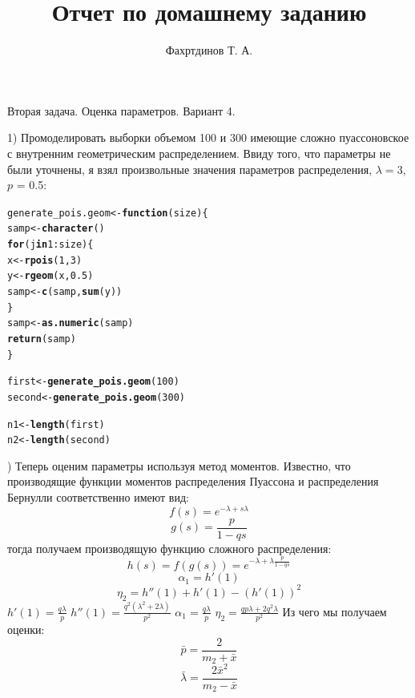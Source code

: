 \documentclass{article}\usepackage[]{graphicx}\usepackage[]{color}
\makeatletter
\newcommand{\hlnum}[1]{\textcolor[rgb]{0.686,0.059,0.569}{#1}}%
\newcommand{\hlopt}[1]{\textcolor[rgb]{0,0,0}{#1}}%
\newcommand{\hlstd}[1]{\textcolor[rgb]{0.345,0.345,0.345}{#1}}%
\newcommand{\hlkwa}[1]{\textcolor[rgb]{0.161,0.373,0.58}{\textbf{#1}}}%
\newcommand{\hlkwb}[1]{\textcolor[rgb]{0.69,0.353,0.396}{#1}}%
\newcommand{\hlkwc}[1]{\textcolor[rgb]{0.333,0.667,0.333}{#1}}%
\newcommand{\hlkwd}[1]{\textcolor[rgb]{0.737,0.353,0.396}{\textbf{#1}}}%
\newenvironment{kframe}{%
 \def\at@end@of@kframe{}%
 \ifinner\ifhmode%
  \def\at@end@of@kframe{\end{minipage}}%
  \begin{minipage}{\columnwidth}%
 \fi\fi%
 \def\FrameCommand##1{\hskip\@totalleftmargin \hskip-\fboxsep
 \colorbox{shadecolor}{##1}\hskip-\fboxsep
     \hskip-\linewidth \hskip-\@totalleftmargin \hskip\columnwidth}%
 \MakeFramed {\advance\hsize-\width
   \@totalleftmargin\z@ \linewidth\hsize
   \@setminipage}}%
 {\par\unskip\endMakeFramed%
 \at@end@of@kframe}
\newenvironment{knitrout}{}{} %
\makeatother
\begin{document}
\title{Отчет по домашнему заданию}
\pretitle{\vspace{\droptitle}\centering\huge}
\posttitle{\par}
\author{Фахртдинов Т. А.}


\maketitle

Вторая задача. Оценка параметров.
Вариант 4.

1) Промоделировать выборки объемом 100 и 300 имеющие сложно пуассоновское с внутренним геометрическим распределением. Ввиду того, что параметры не были уточнены, я взял произвольные значения параметров распределения, $\lambda = 3$, $p$ = 0.5:
\begin{knitrout}
\color{fgcolor}\begin{kframe}
\begin{alltt}
\hlstd{generate_pois.geom} \hlkwb{<-} \hlkwa{function}\hlstd{(}\hlkwc{size}\hlstd{)\{}
  \hlstd{samp} \hlkwb{<-} \hlkwd{character}\hlstd{()}
  \hlkwa{for} \hlstd{(j} \hlkwa{in} \hlnum{1}\hlopt{:}\hlstd{size) \{}
    \hlstd{x} \hlkwb{<-} \hlkwd{rpois}\hlstd{(}\hlnum{1}\hlstd{,} \hlnum{3}\hlstd{)}
    \hlstd{y} \hlkwb{<-} \hlkwd{rgeom}\hlstd{(x,} \hlnum{0.5}\hlstd{)}
    \hlstd{samp} \hlkwb{<-} \hlkwd{c}\hlstd{(samp,} \hlkwd{sum}\hlstd{(y))}
  \hlstd{\}}
  \hlstd{samp} \hlkwb{<-} \hlkwd{as.numeric}\hlstd{(samp)}
  \hlkwd{return}\hlstd{(samp)}
\hlstd{\}}

\hlstd{first} \hlkwb{<-} \hlkwd{generate_pois.geom}\hlstd{(}\hlnum{100}\hlstd{)}
\hlstd{second} \hlkwb{<-} \hlkwd{generate_pois.geom}\hlstd{(}\hlnum{300}\hlstd{)}

\hlstd{n1} \hlkwb{<-} \hlkwd{length}\hlstd{(first)}
\hlstd{n2} \hlkwb{<-} \hlkwd{length}\hlstd{(second)}
\end{alltt}
\end{kframe}
\end{knitrout}
2) Теперь оценим параметры используя метод моментов.
Известно, что производящие функции моментов распределения Пуассона и распределения Бернулли соответственно имеют вид:
$$f(s) = e^{-\lambda + s\lambda}$$
$$g(s) = \frac{p}{1 - qs}$$
тогда получаем производящую функцию сложного распределения:
$$h(s) = f(g(s)) = e^{-\lambda + \lambda  \frac{p}{1 - qs}}$$
$$\alpha_1 = h'(1)$$
$$\eta_2 = h''(1) + h'(1) - (h'(1))^2$$
$h'(1) = \frac{q\lambda}{p}$ \; $h''(1) = \frac{q^2(\lambda^2 + 2\lambda)}{p^2}$
\newline
\newline
$\alpha_1 = \frac{q\lambda}{p}$ \; $\eta_2 = \frac{qp\lambda + 2q^2\lambda}{p^2}$
\newline
Из чего мы получаем оценки:
$$\bar p = \frac{2}{m_2 + \bar x}$$
$$\bar \lambda = \frac{2 \bar x^2}{m_2 - \bar x}$$
\end{document}
